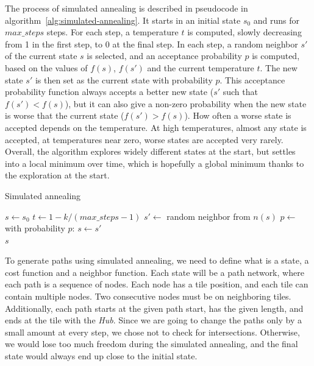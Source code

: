 The process of simulated annealing is described in pseudocode in algorithm~\ref{alg:simulated-annealing}.
It starts in an initial state $s_0$ and runs for $max\_steps$ steps.
For each step, a temperature $t$ is computed, slowly decreasing from 1 in the first step, to 0 at the final step.
In each step, a random neighbor $s'$ of the current state $s$ is selected, and an acceptance probability $p$ is computed, based on the values of $f(s)$, $f(s')$ and the current temperature $t$.
The new state $s'$ is then set as the current state with probability $p$.
This acceptance probability function always accepts a better new state ($s'$ such that $f(s') < f(s)$), but it can also give a non-zero probability when the new state is worse that the current state ($f(s') > f(s)$).
How often a worse state is accepted depends on the temperature.
At high temperatures, almost any state is accepted, at temperatures near zero, worse states are accepted very rarely.
Overall, the algorithm explores widely different states at the start, but settles into a local minimum over time, which is hopefully a global minimum thanks to the exploration at the start.

\begin{algorithm}[H]
    \caption{Simulated annealing}
    \label{alg:simulated-annealing}
    \begin{algorithmic}[1]
        \State $s \gets s_0$
        \State $t \gets 1 - k/(max\_steps-1)$
        \State $s' \gets$ random neighbor from $n(s)$
        \State $p \gets$ 
        \State with probability $p$: $s \gets s'$
        \EndFor\\
        \Return $s$
        \Statex
    \end{algorithmic}
\end{algorithm}

To generate paths using simulated annealing, we need to define what is a state, a cost function and a neighbor function.
Each state will be a path network, where each path is a sequence of nodes.
Each node has a tile position, and each tile can contain multiple nodes.
Two consecutive nodes must be on neighboring tiles.
Additionally, each path starts at the given path start, has the given length, and ends at the tile with the \emph{Hub}.
Since we are going to change the paths only by a small amount at every step, we chose not to check for intersections.
Otherwise, we would lose too much freedom during the simulated annealing, and the final state would always end up close to the initial state.

